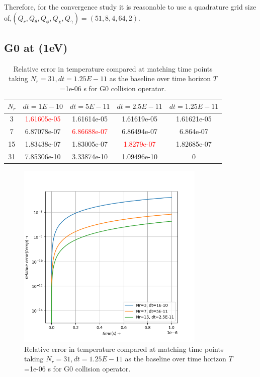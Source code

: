 \documentclass{article}
\begin{document}
Therefore, for the convergence study it is reasonable to use a quadrature grid size of,$(Q_{r}, Q_{\theta}, Q_{\phi},Q_{\chi},Q_{\gamma}) =(51,8,4,64,2)$.

\subsection{G0 at (1eV)}
\begin{table}[H]
	\centering
	\begin{tabular}{|c|c|c|c|c|}
		\hline
		$N_r$ & $dt=1E-10$ & $dt=5E-11$ & $dt=2.5E-11$ & $dt=1.25E-11$\\
		\hline
		3   & \textcolor{red}{1.61605e-05} & 1.61614e-05  & 1.61619e-05  &  1.61621e-05 \\
		7   & 6.87078e-07 & \textcolor{red}{6.86688e-07}  &  6.86494e-07 &   6.864e-07 \\
		15  & 1.83438e-07 & 1.83005e-07  &  \textcolor{red}{1.8279e-07}  &  1.82685e-07 \\
		31  & 7.85306e-10 & 3.33874e-10  &  1.09496e-10 &   0 \\
		\hline
	\end{tabular}
	\caption{Relative error in temperature compared at matching time points taking $N_r=31,dt=1.25E-11$ as the baseline over time horizon $T$=1e-06 s for G0 collision operator. }
\end{table}

\begin{figure}[H]
	\centering
	\includegraphics[width=0.8\textwidth]{fig/g0_temp_convergence.png}
	\caption{Relative error in temperature compared at matching time points taking $N_r=31,dt=1.25E-11$ as the baseline over time horizon $T$=1e-06 s for G0 collision operator. }
\end{figure}
\end{document}
